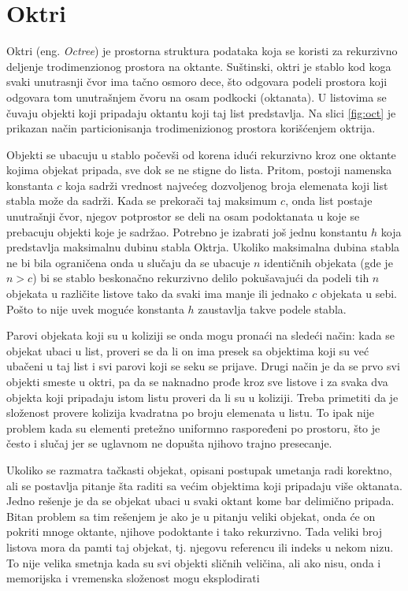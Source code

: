 \documentclass[12pt,oneside]{memoir}
\begin{document}
\section{Oktri}
\label{subsec:octree}

Oktri (eng. {\em Octree}) je prostorna struktura podataka koja se koristi za rekurzivno deljenje trodimenzionog prostora na oktante.
Suštinski, oktri je stablo kod koga svaki unutrasnji čvor ima tačno osmoro dece,
što odgovara podeli prostora koji odgovara tom unutrašnjem čvoru na osam podkocki (oktanata).
U listovima se čuvaju objekti koji pripadaju oktantu koji taj list predstavlja.
Na slici \ref{fig:oct} je prikazan način particionisanja trodimenizionog prostora korišćenjem oktrija.

Objekti se ubacuju u stablo počevši od korena idući rekurzivno kroz one oktante kojima objekat pripada,
sve dok se ne stigne do lista.
Pritom, postoji namenska konstanta $c$ koja sadrži vrednost najvećeg dozvoljenog broja elemenata koji list stabla može da sadrži.
Kada se prekorači taj maksimum $c$, onda list postaje unutrašnji čvor, njegov potprostor se deli 
na osam podoktanata u koje se prebacuju objekti koje je sadržao.
Potrebno je izabrati još jednu konstantu $h$ koja predstavlja maksimalnu dubinu stabla Oktrja.
Ukoliko maksimalna dubina stabla ne bi bila ograničena onda u slučaju da se ubacuje $n$ identičnih objekata (gde je $n > c$) bi se stablo 
beskonačno rekurzivno delilo pokušavajući da podeli tih $n$ objekata u različite listove 
tako da svaki ima manje ili jednako $c$ objekata u sebi. 
Pošto to nije uvek moguće konstanta $h$ zaustavlja takve podele stabla.

Parovi objekata koji su u koliziji se onda mogu pronaći na sledeći način:
kada se objekat ubaci u list, proveri se da li on ima presek sa objektima koji su već
ubačeni u taj list i svi parovi koji se seku se prijave.
Drugi način je da se prvo svi objekti smeste u oktri, 
pa da se naknadno prođe kroz sve listove i za svaka dva objekta koji pripadaju istom listu proveri da li su u koliziji.
Treba primetiti da je složenost provere kolizija kvadratna po broju elemenata u listu.
To ipak nije problem kada su elementi pretežno uniformno raspoređeni po prostoru, što je često 
i slučaj jer se uglavnom ne dopušta njihovo trajno presecanje. 

Ukoliko se razmatra tačkasti objekat, opisani postupak umetanja radi korektno,
ali se postavlja pitanje šta raditi sa većim objektima koji pripadaju više oktanata.
Jedno rešenje je da se objekat ubaci u svaki oktant kome bar delimično pripada. 
Bitan problem sa tim rešenjem je ako je u pitanju veliki objekat, onda će on pokriti mnoge oktante, njihove 
podoktante i tako rekurzivno. 
Tada veliki broj listova mora da pamti taj objekat, tj. njegovu referencu ili indeks u nekom nizu.
To nije velika smetnja kada su svi objekti sličnih veličina, ali ako 
nisu, onda i memorijska i vremenska složenost mogu eksplodirati
\end{document}
